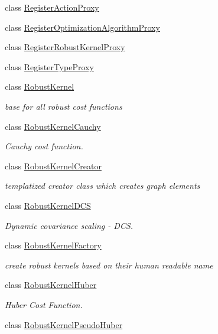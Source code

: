 \begin{DoxyCompactItemize}
class \hyperlink{classg2o_1_1RegisterActionProxy}{Register\+Action\+Proxy}
\item 
class \hyperlink{classg2o_1_1RegisterOptimizationAlgorithmProxy}{Register\+Optimization\+Algorithm\+Proxy}
\item 
class \hyperlink{classg2o_1_1RegisterRobustKernelProxy}{Register\+Robust\+Kernel\+Proxy}
\item 
class \hyperlink{classg2o_1_1RegisterTypeProxy}{Register\+Type\+Proxy}
\item 
class \hyperlink{classg2o_1_1RobustKernel}{Robust\+Kernel}
\begin{DoxyCompactList}\small\item\em base for all robust cost functions \end{DoxyCompactList}\item 
class \hyperlink{classg2o_1_1RobustKernelCauchy}{Robust\+Kernel\+Cauchy}
\begin{DoxyCompactList}\small\item\em Cauchy cost function. \end{DoxyCompactList}\item 
class \hyperlink{classg2o_1_1RobustKernelCreator}{Robust\+Kernel\+Creator}
\begin{DoxyCompactList}\small\item\em templatized creator class which creates graph elements \end{DoxyCompactList}\item 
class \hyperlink{classg2o_1_1RobustKernelDCS}{Robust\+Kernel\+D\+CS}
\begin{DoxyCompactList}\small\item\em Dynamic covariance scaling -\/ D\+CS. \end{DoxyCompactList}\item 
class \hyperlink{classg2o_1_1RobustKernelFactory}{Robust\+Kernel\+Factory}
\begin{DoxyCompactList}\small\item\em create robust kernels based on their human readable name \end{DoxyCompactList}\item 
class \hyperlink{classg2o_1_1RobustKernelHuber}{Robust\+Kernel\+Huber}
\begin{DoxyCompactList}\small\item\em Huber Cost Function. \end{DoxyCompactList}\item 
class \hyperlink{classg2o_1_1RobustKernelPseudoHuber}{Robust\+Kernel\+Pseudo\+Huber}

\end{DoxyCompactItemize}
